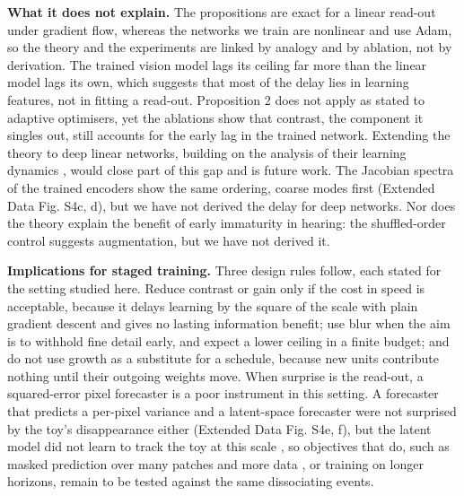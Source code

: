 \documentclass{article}
\begin{document}
\textbf{What it does not explain.} The propositions are exact for a linear read-out under gradient flow, whereas the networks we train are nonlinear and use Adam, so the theory and the experiments are linked by analogy and by ablation, not by derivation. The trained vision model lags its ceiling far more than the linear model lags its own, which suggests that most of the delay lies in learning features, not in fitting a read-out. Proposition 2 does not apply as stated to adaptive optimisers, yet the ablations show that contrast, the component it singles out, still accounts for the early lag in the trained network. Extending the theory to deep linear networks, building on the analysis of their learning dynamics \autocite{saxe2019mathematical}, would close part of this gap and is future work. The Jacobian spectra of the trained encoders show the same ordering, coarse modes first (Extended Data Fig. S4c, d), but we have not derived the delay for deep networks. Nor does the theory explain the benefit of early immaturity in hearing: the shuffled-order control suggests augmentation, but we have not derived it.

\textbf{Implications for staged training.} Three design rules follow, each stated for the setting studied here. Reduce contrast or gain only if the cost in speed is acceptable, because it delays learning by the square of the scale with plain gradient descent and gives no lasting information benefit; use blur when the aim is to withhold fine detail early, and expect a lower ceiling in a finite budget; and do not use growth as a substitute for a schedule, because new units contribute nothing until their outgoing weights move. When surprise is the read-out, a squared-error pixel forecaster is a poor instrument in this setting. A forecaster that predicts a per-pixel variance and a latent-space forecaster were not surprised by the toy's disappearance either (Extended Data Fig. S4e, f), but the latent model did not learn to track the toy at this scale \autocite{mohapatra2026senses}, so objectives that do, such as masked prediction over many patches and more data \autocite{garrido2025intuitive}, or training on longer horizons, remain to be tested against the same dissociating events.
\end{document}
